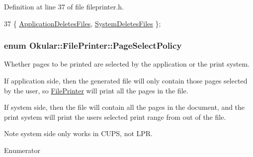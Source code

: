 Definition at line 37 of file fileprinter.\+h.


\begin{DoxyCode}
37 \{ \hyperlink{classOkular_1_1FilePrinter_acd01eb48e99f9289a7f4786a366ef7baa3dc2e24676385e73e2e9f623c49cc94a}{ApplicationDeletesFiles}, \hyperlink{classOkular_1_1FilePrinter_acd01eb48e99f9289a7f4786a366ef7baa86d9b928c2434b89a15de26c8cc22705}{SystemDeletesFiles} \};
\end{DoxyCode}
\hypertarget{classOkular_1_1FilePrinter_a755b647910344031db1d79312482981d}{
\subsubsection[{Page\+Select\+Policy}]{\setlength{\rightskip}{0pt plus 5cm}enum {\bf Okular\+::\+File\+Printer\+::\+Page\+Select\+Policy}}}\label{classOkular_1_1FilePrinter_a755b647910344031db1d79312482981d}
Whether pages to be printed are selected by the application or the print system.

If application side, then the generated file will only contain those pages selected by the user, so \hyperlink{classOkular_1_1FilePrinter}{File\+Printer} will print all the pages in the file.

If system side, then the file will contain all the pages in the document, and the print system will print the users selected print range from out of the file.

Note system side only works in C\+U\+P\+S, not L\+P\+R. \begin{Desc}
\item[Enumerator]\par
\begin{description}
\item[{\em 
\hypertarget{classOkular_1_1FilePrinter_a755b647910344031db1d79312482981da3910c7efe4c8f4f8a69459765bea25a4}{Application\+Selects\+Pages}\label{classOkular_1_1FilePrinter_a755b647910344031db1d79312482981da3910c7efe4c8f4f8a69459765bea25a4}
}]\item[{\em 
\hypertarget{classOkular_1_1FilePrinter_a755b647910344031db1d79312482981dad7061722165845cb9b893916a6442797}{System\+Selects\+Pages}\label{classOkular_1_1FilePrinter_a755b647910344031db1d79312482981dad7061722165845cb9b893916a6442797}
}]\end{description}
\end{Desc}


